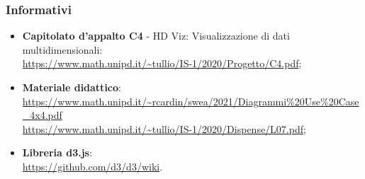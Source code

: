     \subsubsection{Informativi}
    \begin{itemize}
        \item \textbf{Capitolato d'appalto C4} - HD Viz: Visualizzazione di dati multidimensionali:\\\url{https://www.math.unipd.it/~tullio/IS-1/2020/Progetto/C4.pdf};
        \item \textbf{Materiale didattico}: \\\url{https://www.math.unipd.it/~rcardin/swea/2021/Diagrammi%20Use%20Case_4x4.pdf}
        \\\url{https://www.math.unipd.it/~tullio/IS-1/2020/Dispense/L07.pdf};
        \item \textbf{Libreria d3.js}:
        \\\url{https://github.com/d3/d3/wiki}.
    \end{itemize}